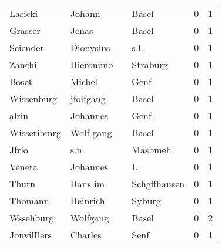 \begin{center}
\begin{tiny}
\begin{longtabu}{llllrr}
                  Lasicki &                             Johann &             &                                       Basel &          0 &         1 \\
                  Grasser &                              Jenas &             &                                       Basel &          0 &         1 \\
                 Seiender &                          Dionysius &             &                                        s.l. &          0 &         1 \\
                   Zanchi &                          Hieronimo &             &                                    Straburg &          0 &         1 \\
                    Boset &                             Michel &             &                                        Genf &          0 &         1 \\
               Wissenburg &                          jfoifgang &             &                                       Basel &          0 &         1 \\
                    alrin &                           Johannes &             &                                        Genf &          0 &         1 \\
              Wisseribmrg &                          Wolf gang &             &                                       Basel &          0 &         1 \\
                    Jfrlo &                               s.n. &             &                                     Masbmeh &          0 &         1 \\
                   Veneta &                           Johannes &             &                                           L &          0 &         1 \\
                    Thurn &                            Hans im &             &                                Schgffhausen &          0 &         1 \\
                  Thomann &                           Heinrich &             &                                      Syburg &          0 &         1 \\
                Wssehburg &                           Wolfgang &             &                                       Basel &          0 &         2 \\
              JonvilIlers &                            Charles &             &                                        Senf &          0 &         1 \\

\end{longtabu}
\end{tiny}
\end{center}
